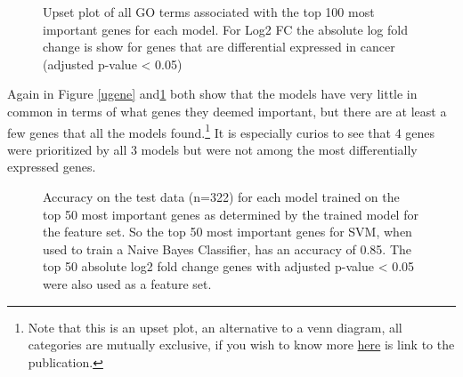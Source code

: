 \FloatBarrier
\FloatBarrier
\begin{figure}[htb!]
    \center
    \caption{Upset plot of all GO terms associated with the top 100 most important genes for each model. For Log2 FC the absolute log fold change is show for genes that are differential expressed in cancer (adjusted p-value < 0.05)}
    \label{ugo}
\end{figure}
\FloatBarrier
Again in Figure \ref{ugene} and\ref{ugo} both show that the models have very little in common in terms of what genes they deemed important, but there are at least a few genes that all the models found.\footnote{Note that this is an upset plot, an alternative to a venn diagram, all categories are mutually exclusive, if you wish to know more \href{https://www.ncbi.nlm.nih.gov/pmc/articles/PMC4720993/}{here} is link to the publication.}
It is especially curios to see that 4 genes were prioritized by all 3 models but were not among the most differentially expressed genes.
\FloatBarrier
\begin{figure}[htb!]
    \center
    \caption{Accuracy on the test data (n=322) for each model trained on the top 50 most important genes as determined by the trained model for the feature set. So the top 50 most important genes for SVM, when used to train a Naive Bayes Classifier, has an accuracy of 0.85. The top 50 absolute log2 fold change genes with adjusted p-value < 0.05 were also used as a feature set.}
    \label{heat}
\end{figure}
